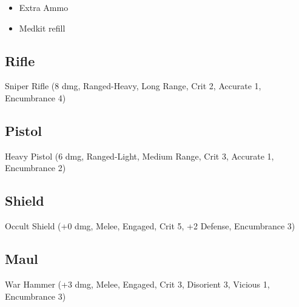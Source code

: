 \documentclass[background]{book}
\begin{document}
\begin{multicols}{2}
\begin{itemize}
    \item Extra Ammo
    \item Medkit refill
\end{itemize}

\subsection{Rifle}

Sniper Rifle (8 dmg, Ranged-Heavy, Long Range, Crit 2, Accurate 1, Encumbrance 4)

\subsection{Pistol}

Heavy Pistol (6 dmg, Ranged-Light, Medium Range, Crit 3, Accurate 1, Encumbrance 2)

\subsection{Shield}

Occult Shield (+0 dmg, Melee, Engaged, Crit 5, +2 Defense, Encumbrance 3)

\subsection{Maul}

War Hammer (+3 dmg, Melee, Engaged, Crit 3, Disorient 3, Vicious 1, Encumbrance 3)



\end{multicols}
\end{document}
